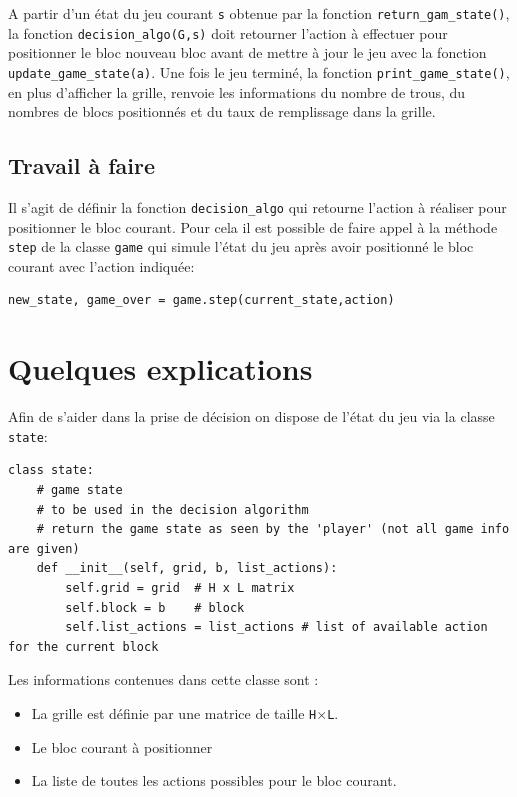 \documentclass[10pt,a4paper]{article}
\begin{document}
A partir d'un état du jeu courant \texttt{s} obtenue par la fonction \texttt{return_gam_state()}, la fonction \texttt{decision_algo(G,s)} doit retourner l'action à effectuer pour positionner le bloc nouveau bloc avant de mettre à jour le jeu avec la fonction \texttt{update_game_state(a)}. Une fois le jeu terminé, la fonction \texttt{print_game_state()}, en plus d'afficher la grille, renvoie les informations du nombre de trous, du nombres de blocs positionnés et du taux de remplissage dans la grille. 

\subsection*{Travail à faire}

Il s'agit de définir la fonction \texttt{decision_algo} qui retourne l'action à réaliser pour positionner le bloc courant. Pour cela il est possible de faire appel à la méthode \texttt{step} de la classe \texttt{game} qui simule l'état du jeu après avoir positionné le bloc courant avec l'action indiquée:
\begin{verbatim}
new_state, game_over = game.step(current_state,action)
\end{verbatim}

\section*{Quelques explications}

Afin de s'aider dans la prise de décision on dispose de l'état du jeu via la classe \texttt{state}:

\begin{verbatim}
class state:
	# game state 
	# to be used in the decision algorithm
	# return the game state as seen by the 'player' (not all game info are given)
	def __init__(self, grid, b, list_actions):
		self.grid = grid  # H x L matrix
		self.block = b    # block
		self.list_actions = list_actions # list of available action for the current block
\end{verbatim}

Les informations contenues dans cette classe sont :
\begin{itemize}
	\item La grille est définie par une matrice de taille \texttt{H}$\times$\texttt{L}.
	\item Le bloc courant à positionner
	\item La liste de toutes les actions possibles pour le bloc courant.
\end{itemize}
\medskip
\end{document}
